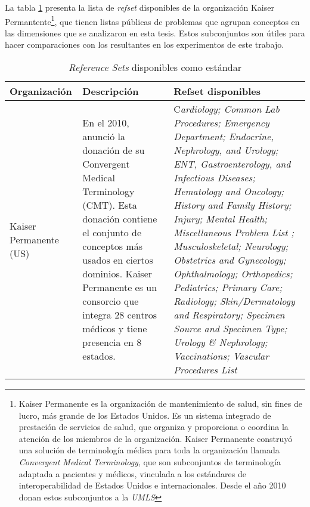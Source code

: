 La tabla \ref{refsetsSnomed} presenta la lista de \textit{\acrshort{refset}} disponibles de la organización Kaiser Permantente\footnote{Kaiser Permanente es la organización de mantenimiento de salud, sin fines de lucro, más grande de los Estados Unidos. Es un sistema integrado de prestación de servicios de salud, que organiza y proporciona o coordina la atención de los miembros de la organización. Kaiser Permanente construyó una solución de terminología médica para toda la organización llamada \textit{Convergent Medical Terminology}, que son subconjuntos de terminología adaptada a pacientes y médicos, vinculada a los estándares de interoperabilidad de Estados Unidos e internacionales. Desde el año 2010 donan estos subconjuntos a la \textit{\acrfull{UMLS}}
}, que tienen listas públicas de problemas que agrupan conceptos en las dimensiones que se analizaron en esta tesis. Estos subconjuntos son útiles para hacer comparaciones con los resultantes en los experimentos de este trabajo.

\begin{table}[htb]
\caption{\textit{Reference Sets} disponibles como estándar}
\label{refsetsSnomed}
\begin{tabularx}{\textwidth}{@{}XXX@{}}
\toprule
Organización & Descripción & Refset disponibles \\ \midrule
Kaiser Permanente (US) & En el 2010, anunció la donación de su Convergent Medical Terminology (CMT). Esta donación contiene el conjunto de conceptos más usados en ciertos dominios. Kaiser Permanente es un consorcio que integra 28 centros médicos y tiene presencia en 8 estados. & C\textit{ardiology; Common Lab Procedures; Emergency Department; Endocrine,  Nephrology, and Urology; ENT, Gastroenterology, and Infectious Diseases; Hematology and Oncology; History and Family History; Injury; Mental Health; Miscellaneous Problem List ; Musculoskeletal; Neurology; Obstetrics and Gynecology; Ophthalmology; Orthopedics; Pediatrics; Primary Care; Radiology; Skin/Dermatology and Respiratory; Specimen Source and Specimen Type; Urology \& Nephrology; Vaccinations; Vascular Procedures List} \\
\bottomrule
\end{tabularx}
\end{table}

